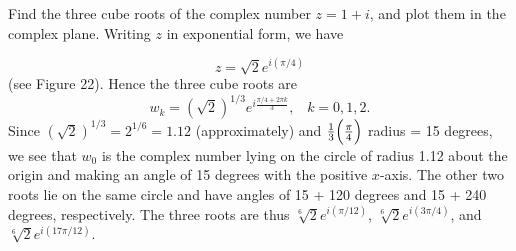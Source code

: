 
\begin{example}
Find the three cube roots of the complex number $z = 1 + i$, and plot them
in the complex plane. Writing $z$ in exponential form, we have

$$
z = \sqrt{2} e^{i(\pi/4)}
$$
\noindent (see Figure 22). Hence the three cube roots are
$$
w_k = (\sqrt 2)^{1/3} e ^{i \frac{\pi/4 + 2\pi k}{3}}, \;\;\; k = 0, 1, 2. 
$$
\noindent Since $(\sqrt 2)^{1/3} = 2^{1/6} = 1.12$ (approximately) and $\frac{1}{3} \Bigl(\frac{\pi}{4}\Bigr)$ radius = 15 degrees, we see that $w_0$ is the complex number lying on the circle of radius 1.12 about the origin and making an angle of 15 degrees with the positive $x$-axis. The other two roots lie on the same circle and have angles of 15 + 120 degrees and 15 + 240 degrees, respectively. The three roots are thus $\sqrt[6]{2} e^{i(\pi/12)}$, $\sqrt[6]{2} e^{i(3\pi/4)}$, and  $\sqrt[6]{2} e^{i(17 \pi/12)}$.
\end{example}

